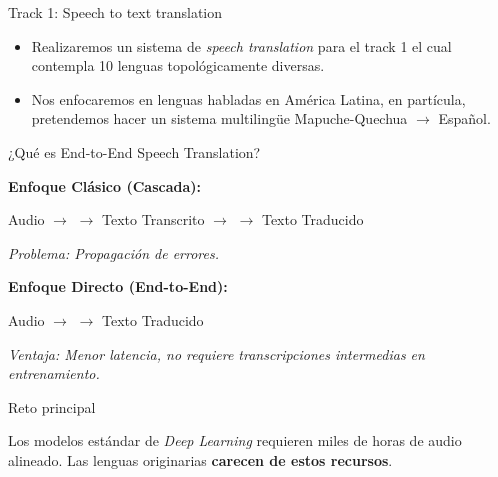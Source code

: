 \documentclass[11pt]{beamer}
\begin{document}
\begin{frame}{Track 1: Speech to text translation}

\begin{itemize}
    \item <1-> Realizaremos un sistema de \textit{speech translation} para el track 1 el cual contempla 10 lenguas topológicamente diversas.
    \item <2-> Nos enfocaremos en lenguas habladas en América Latina, en partícula, pretendemos hacer un sistema multilingüe Mapuche-Quechua $\rightarrow$ Español.
\end{itemize}

\end{frame}

\begin{frame}{¿Qué es End-to-End Speech Translation?}

    \textbf{Enfoque Clásico (Cascada):}
    \begin{center}
        Audio $\rightarrow$  $\rightarrow$ Texto Transcrito $\rightarrow$  $\rightarrow$ Texto Traducido
    \end{center}
    \textit{Problema: Propagación de errores.}

    \vspace{0.5cm}
    \textbf{Enfoque Directo (End-to-End):}
    \begin{center}
        Audio $\rightarrow$  $\rightarrow$ Texto Traducido
    \end{center}
    \textit{Ventaja: Menor latencia, no requiere transcripciones intermedias en entrenamiento.}

\end{frame}





\begin{frame}{Reto principal}

 \large Los modelos estándar de \textit{Deep Learning} requieren miles de horas de audio alineado. Las lenguas originarias \textbf{carecen de estos recursos}.

\end{frame}
\end{document}
